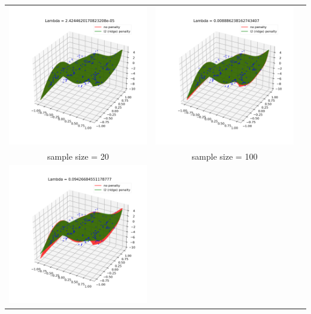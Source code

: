 \documentclass[11pt]{article}
\begin{document}
  \begin{center}
    \setlength\tabcolsep{0pt}
    \begin{tabular}{ccc}
    \includegraphics[width=7cm]{regression/2d-ridge-ls-compare-27-200lnlam--4.615384615384617-fig.png}
    & \includegraphics[width=7cm]{regression/2d-ridge-ls-compare-27-200lnlam--2.051282051282051-fig.png}\\
    sample size = 20 & sample size = 100\\
    \includegraphics[width=7cm]{regression/2d-ridge-ls-compare-27-200lnlam--1.025641025641029-fig.png}

\end{tabular}
\end{center}
\end{document}
